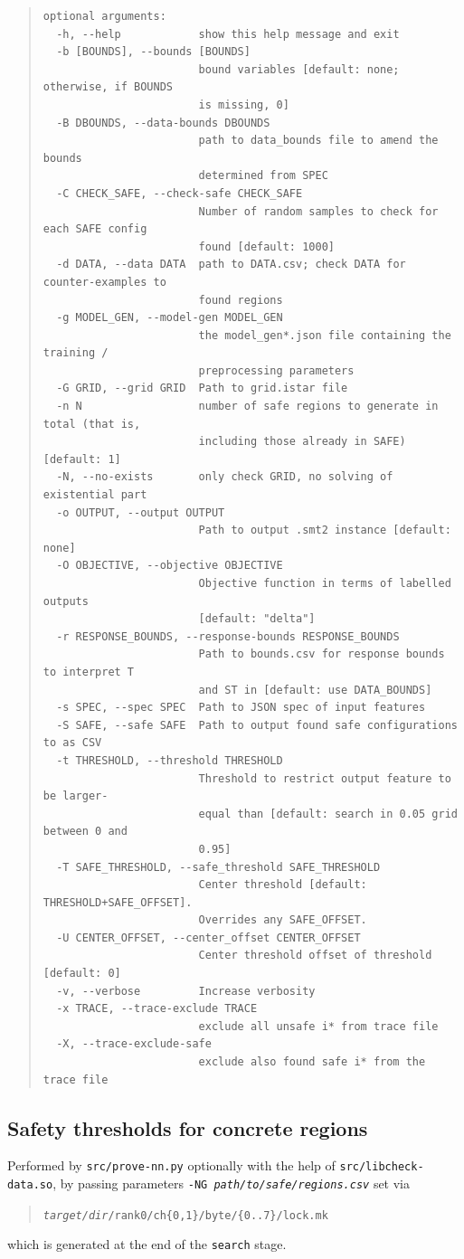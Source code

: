 \documentclass[a4paper,parskip=half]{article} %
\newcommand*\cmdstyle\texttt
\newcommand*\file\cmdstyle
\newcommand*\cmd[1]{\cmdstyle{\textcolor{red!85!black}{#1}}}
\newenvironment{cmdhelp}{\begin{quote}\footnotesize}{\end{quote}}
\newcommand*\provenn{prove-nn.py}
\begin{document}
\begin{cmdhelp}
\begin{verbatim}
optional arguments:
  -h, --help            show this help message and exit
  -b [BOUNDS], --bounds [BOUNDS]
                        bound variables [default: none; otherwise, if BOUNDS
                        is missing, 0]
  -B DBOUNDS, --data-bounds DBOUNDS
                        path to data_bounds file to amend the bounds
                        determined from SPEC
  -C CHECK_SAFE, --check-safe CHECK_SAFE
                        Number of random samples to check for each SAFE config
                        found [default: 1000]
  -d DATA, --data DATA  path to DATA.csv; check DATA for counter-examples to
                        found regions
  -g MODEL_GEN, --model-gen MODEL_GEN
                        the model_gen*.json file containing the training /
                        preprocessing parameters
  -G GRID, --grid GRID  Path to grid.istar file
  -n N                  number of safe regions to generate in total (that is,
                        including those already in SAFE) [default: 1]
  -N, --no-exists       only check GRID, no solving of existential part
  -o OUTPUT, --output OUTPUT
                        Path to output .smt2 instance [default: none]
  -O OBJECTIVE, --objective OBJECTIVE
                        Objective function in terms of labelled outputs
                        [default: "delta"]
  -r RESPONSE_BOUNDS, --response-bounds RESPONSE_BOUNDS
                        Path to bounds.csv for response bounds to interpret T
                        and ST in [default: use DATA_BOUNDS]
  -s SPEC, --spec SPEC  Path to JSON spec of input features
  -S SAFE, --safe SAFE  Path to output found safe configurations to as CSV
  -t THRESHOLD, --threshold THRESHOLD
                        Threshold to restrict output feature to be larger-
                        equal than [default: search in 0.05 grid between 0 and
                        0.95]
  -T SAFE_THRESHOLD, --safe_threshold SAFE_THRESHOLD
                        Center threshold [default: THRESHOLD+SAFE_OFFSET].
                        Overrides any SAFE_OFFSET.
  -U CENTER_OFFSET, --center_offset CENTER_OFFSET
                        Center threshold offset of threshold [default: 0]
  -v, --verbose         Increase verbosity
  -x TRACE, --trace-exclude TRACE
                        exclude all unsafe i* from trace file
  -X, --trace-exclude-safe
                        exclude also found safe i* from the trace file
\end{verbatim}\end{cmdhelp}


\subsection{Safety thresholds for concrete regions}
Performed by \cmd{src/\provenn} optionally with the help of
\cmd{src/libcheck-data.so}, by passing parameters
\cmdstyle{-NG \emph{path/to/safe/regions.csv}} set via
\begin{quote}
	\file{\emph{target/dir}/rank0/ch\{0,1\}/byte/\{0..7\}/lock.mk}
\end{quote}
which is generated at the end of the \cmdstyle{search} stage.
\end{document}
